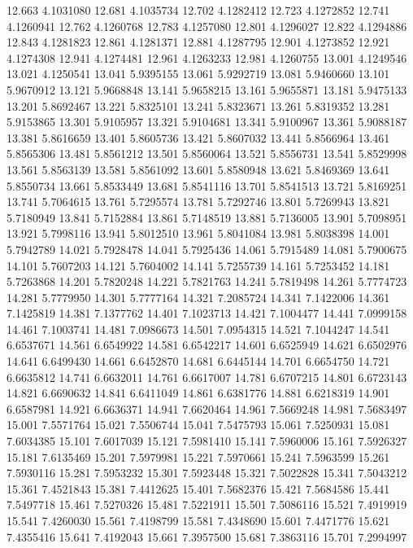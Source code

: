 12.663 4.1031080
12.681 4.1035734
12.702 4.1282412
12.723 4.1272852
12.741 4.1260941
12.762 4.1260768
12.783 4.1257080
12.801 4.1296027
12.822 4.1294886
12.843 4.1281823
12.861 4.1281371
12.881 4.1287795
12.901 4.1273852
12.921 4.1274308
12.941 4.1274481
12.961 4.1263233
12.981 4.1260755
13.001 4.1249546
13.021 4.1250541
13.041 5.9395155
13.061 5.9292719
13.081 5.9460660
13.101 5.9670912
13.121 5.9668848
13.141 5.9658215
13.161 5.9655871
13.181 5.9475133
13.201 5.8692467
13.221 5.8325101
13.241 5.8323671
13.261 5.8319352
13.281 5.9153865
13.301 5.9105957
13.321 5.9104681
13.341 5.9100967
13.361 5.9088187
13.381 5.8616659
13.401 5.8605736
13.421 5.8607032
13.441 5.8566964
13.461 5.8565306
13.481 5.8561212
13.501 5.8560064
13.521 5.8556731
13.541 5.8529998
13.561 5.8563139
13.581 5.8561092
13.601 5.8580948
13.621 5.8469369
13.641 5.8550734
13.661 5.8533449
13.681 5.8541116
13.701 5.8541513
13.721 5.8169251
13.741 5.7064615
13.761 5.7295574
13.781 5.7292746
13.801 5.7269943
13.821 5.7180949
13.841 5.7152884
13.861 5.7148519
13.881 5.7136005
13.901 5.7098951
13.921 5.7998116
13.941 5.8012510
13.961 5.8041084
13.981 5.8038398
14.001 5.7942789
14.021 5.7928478
14.041 5.7925436
14.061 5.7915489
14.081 5.7900675
14.101 5.7607203
14.121 5.7604002
14.141 5.7255739
14.161 5.7253452
14.181 5.7263868
14.201 5.7820248
14.221 5.7821763
14.241 5.7819498
14.261 5.7774723
14.281 5.7779950
14.301 5.7777164
14.321 7.2085724
14.341 7.1422006
14.361 7.1425819
14.381 7.1377762
14.401 7.1023713
14.421 7.1004477
14.441 7.0999158
14.461 7.1003741
14.481 7.0986673
14.501 7.0954315
14.521 7.1044247
14.541 6.6537671
14.561 6.6549922
14.581 6.6542217
14.601 6.6525949
14.621 6.6502976
14.641 6.6499430
14.661 6.6452870
14.681 6.6445144
14.701 6.6654750
14.721 6.6635812
14.741 6.6632011
14.761 6.6617007
14.781 6.6707215
14.801 6.6723143
14.821 6.6690632
14.841 6.6411049
14.861 6.6381776
14.881 6.6218319
14.901 6.6587981
14.921 6.6636371
14.941 7.6620464
14.961 7.5669248
14.981 7.5683497
15.001 7.5571764
15.021 7.5506744
15.041 7.5475793
15.061 7.5250931
15.081 7.6034385
15.101 7.6017039
15.121 7.5981410
15.141 7.5960006
15.161 7.5926327
15.181 7.6135469
15.201 7.5979981
15.221 7.5970661
15.241 7.5963599
15.261 7.5930116
15.281 7.5953232
15.301 7.5923448
15.321 7.5022828
15.341 7.5043212
15.361 7.4521843
15.381 7.4412625
15.401 7.5682376
15.421 7.5684586
15.441 7.5497718
15.461 7.5270326
15.481 7.5221911
15.501 7.5086116
15.521 7.4919919
15.541 7.4260030
15.561 7.4198799
15.581 7.4348690
15.601 7.4471776
15.621 7.4355416
15.641 7.4192043
15.661 7.3957500
15.681 7.3863116
15.701 7.2994997
